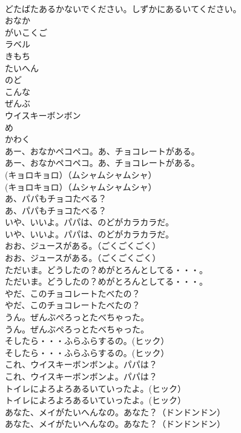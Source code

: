 \documentclass[8pt]{extreport}
\begin{document}
\begin{CJK}{UTF8}{min}
\\	どたばたあるかないでください。しずかにあるいてください。
\\	おなか
\\	がいこくご
\\	ラベル
\\	きもち
\\	たいへん
\\	のど
\\	こんな
\\	ぜんぶ
\\	ウイスキーボンボン
\\	め
\\	かわく
\\	あー、おなかペコペコ。あ、チョコレートがある。
\\	あー、おなかペコペコ。あ、チョコレートがある。
\\	(キョロキョロ）（ムシャムシャムシャ）
\\	(キョロキョロ）（ムシャムシャムシャ）
\\	あ、パパもチョコたべる？
\\	あ、パパもチョコたべる？
\\	いや、いいよ。パパは、のどがカラカラだ。
\\	いや、いいよ。パパは、のどがカラカラだ。
\\	おお、ジュースがある。（ごくごくごく）
\\	おお、ジュースがある。（ごくごくごく）
\\	ただいま。どうしたの？めがとろんとしてる・・・。
\\	ただいま。どうしたの？めがとろんとしてる・・・。
\\	やだ、このチョコレートたべたの？
\\	やだ、このチョコレートたべたの？
\\	うん。ぜんぶぺろっとたべちゃった。
\\	うん。ぜんぶぺろっとたべちゃった。
\\	そしたら・・・ふらふらするの。(ヒック）
\\	そしたら・・・ふらふらするの。(ヒック）
\\	これ、ウイスキーボンボンよ。パパは？
\\	これ、ウイスキーボンボンよ。パパは？
\\	トイレによろよろあるいていったよ。(ヒック）
\\	トイレによろよろあるいていったよ。(ヒック）
\\	あなた、メイがたいへんなの。あなた？（ドンドンドン）
\\	あなた、メイがたいへんなの。あなた？（ドンドンドン）

\end{CJK}
\end{document}
